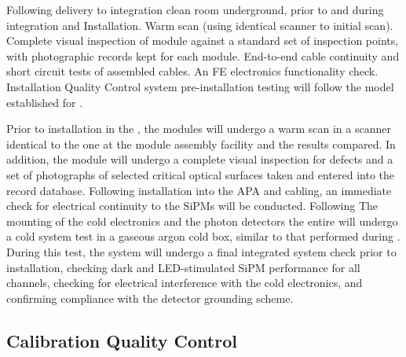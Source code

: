 Following delivery to integration clean room underground, prior to and
during integration and Installation. Warm scan (using identical
scanner to initial scan). Complete visual inspection of module against
a standard set of inspection points, with photographic records kept
for each module. End-to-end cable continuity and short circuit tests
of assembled cables. An FE electronics functionality
check. Installation Quality Control  system pre-installation testing
will follow the model established for .

Prior to installation in the , the  modules will undergo a warm
scan in a scanner identical to the one at the  module assembly
facility and the results compared. In addition, the module will
undergo a complete visual inspection for defects and a set of
photographs of selected critical optical surfaces taken and entered
into the  record database. Following installation into the APA and
cabling, an immediate check for electrical continuity to the SiPMs
will be conducted. Following The mounting of the  cold electronics
and the photon detectors the entire  will undergo a cold system
test in a gaseous argon cold box, similar to that performed during
. During this test, the  system will undergo a final
integrated system check prior to installation, checking dark and
LED-stimulated SiPM performance for all channels, checking for
electrical interference with the cold electronics, and confirming
compliance with the detector grounding scheme.

\subsection{Calibration Quality Control}

